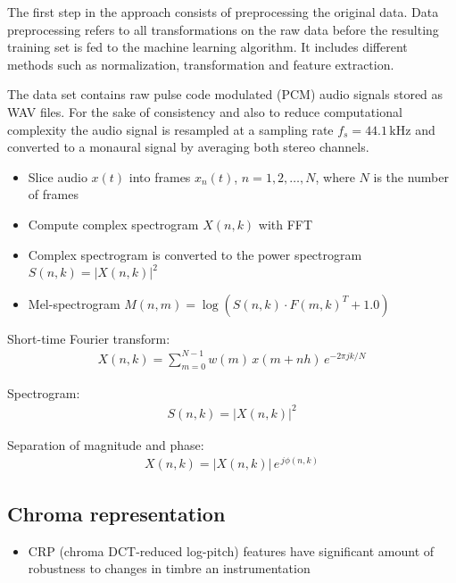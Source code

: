 \documentclass{article}
\begin{document}
The first step in the approach consists of preprocessing the original data. Data preprocessing refers to all transformations on the raw data before the resulting training set is fed to the machine learning algorithm. It includes different methods such as normalization, transformation and feature extraction. 

The data set contains raw pulse code modulated (PCM) audio signals stored as WAV files. For the sake of consistency and also to reduce computational complexity the audio signal is resampled at a sampling rate $f_s = 44.1 \,\text{kHz}$ and converted to a monaural signal by averaging both stereo channels. 


\begin{itemize}
\item Slice audio $x(t)$ into frames $x_n(t)$, $n = 1, 2,\dots, N$, where $N$ is the number of frames
\item Compute complex spectrogram $X(n,k)$ with FFT 
\item Complex spectrogram is converted to the power spectrogram $S(n, k) = |X(n, k)|^2$
\item Mel-spectrogram $M(n,m) = \log \left( S(n,k) \cdot F(m,k)^T + 1.0 \right)$
\end{itemize}
\vspace{1em}

Short-time Fourier transform:
\begin{align}
X(n,k) = \sum_{m = 0}^{N-1} w(m) \, x(m + n  h) \, e^{-2 \pi j  k /N}
\end{align} 

Spectrogram: 
\begin{align}
S(n,k) = |X(n,k)|^2
\end{align} 

Separation of magnitude and phase:
\begin{align} 
X(n,k) = |X(n,k)| \, e^{\, j \phi(n,k)}
\end{align} 


\subsection{Chroma representation}

\begin{itemize}
\item CRP (chroma DCT-reduced log-pitch) features have significant amount of robustness to changes in timbre an instrumentation \cite[Mueller2010]{Mueller2010}
\end{itemize}
\end{document}
